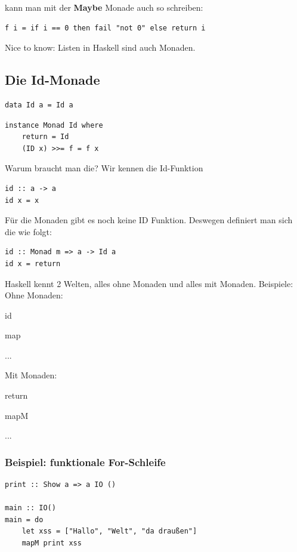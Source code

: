 \documentclass[ngerman,a4paper]{report}
\begin{document}
kann man mit der \textbf{Maybe} Monade auch so schreiben:
\begin{lstlisting}
f i = if i == 0 then fail "not 0" else return i
\end{lstlisting}
Nice to know: Listen in Haskell sind auch Monaden.\\

\subsection{Die Id-Monade}
\begin{lstlisting}
data Id a = Id a
\end{lstlisting}

\begin{lstlisting}
instance Monad Id where
	return = Id 
	(ID x) >>= f = f x 
\end{lstlisting}

Warum braucht man die?
Wir kennen die Id-Funktion
\begin{lstlisting}
id :: a -> a
id x = x
\end{lstlisting}

Für die Monaden gibt es noch keine ID Funktion. Deswegen definiert man sich die wie folgt:

\begin{lstlisting}
id :: Monad m => a -> Id a
id x = return
\end{lstlisting}

Haskell kennt 2 Welten, alles ohne Monaden und alles mit Monaden. Beispiele:\\
Ohne Monaden:
\begin{compactitem}
\item id
\item map
\item ...
\end{compactitem}
Mit Monaden:
\begin{compactitem}
\item return
\item mapM
\item ...
\end{compactitem}

\subsubsection{Beispiel: funktionale For-Schleife}

\begin{lstlisting}
print :: Show a => a IO ()

main :: IO()
main = do
	let xss = ["Hallo", "Welt", "da draußen"]
	mapM print xss
\end{lstlisting}
\end{document}
